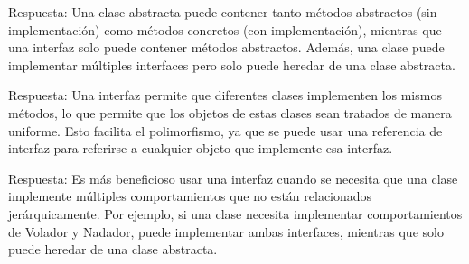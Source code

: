 Respuesta: Una clase abstracta puede contener tanto métodos abstractos (sin implementación) como métodos concretos (con implementación), mientras que una interfaz solo puede contener métodos abstractos. Además, una clase puede implementar múltiples interfaces pero solo puede heredar de una clase abstracta.

Respuesta: Una interfaz permite que diferentes clases implementen los mismos métodos, lo que permite que los objetos de estas clases sean tratados de manera uniforme. Esto facilita el polimorfismo, ya que se puede usar una referencia de interfaz para referirse a cualquier objeto que implemente esa interfaz.

Respuesta: Es más beneficioso usar una interfaz cuando se necesita que una clase implemente múltiples comportamientos que no están relacionados jerárquicamente. Por ejemplo, si una clase necesita implementar comportamientos de Volador y Nadador, puede implementar ambas interfaces, mientras que solo puede heredar de una clase abstracta.